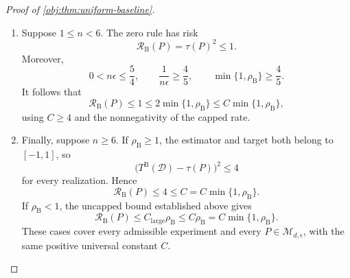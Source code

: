 \begin{proof}[Proof of \cref{obj:thm:uniform-baseline}]
\begin{enumerate}
\item
Suppose \(1\le n<6\). The zero rule has risk
\[
\mathcal R_{\mathrm B}(P)=\tau(P)^2\le1.
\]
Moreover,
\[
0<n\epsilon\le\frac54,
\qquad
\frac{1}{n\epsilon}\ge\frac45,
\qquad
\min\{1,\rho_{\mathrm B}\}\ge\frac45.
\]
It follows that
\[
\mathcal R_{\mathrm B}(P)
\le1
\le2\min\{1,\rho_{\mathrm B}\}
\le C\min\{1,\rho_{\mathrm B}\},
\]
using \(C\ge4\) and the nonnegativity of the capped rate.

\item
Finally, suppose \(n\ge6\). If \(\rho_{\mathrm B}\ge1\), the estimator and target both belong to \([-1,1]\), so
\[
\bigl(T^{\mathrm B}(\mathcal D)-\tau(P)\bigr)^2\le4
\]
for every realization. Hence
\[
\mathcal R_{\mathrm B}(P)
\le4
\le C
=
C\min\{1,\rho_{\mathrm B}\}.
\]
If \(\rho_{\mathrm B}<1\), the uncapped bound established above gives
\[
\mathcal R_{\mathrm B}(P)
\le C_{\mathrm{large}}\rho_{\mathrm B}
\le C\rho_{\mathrm B}
=
C\min\{1,\rho_{\mathrm B}\}.
\]
These cases cover every admissible experiment and every
\(P\in\mathcal M_{d,\epsilon}\), with the same positive universal constant \(C\).
\end{enumerate}
\end{proof}

